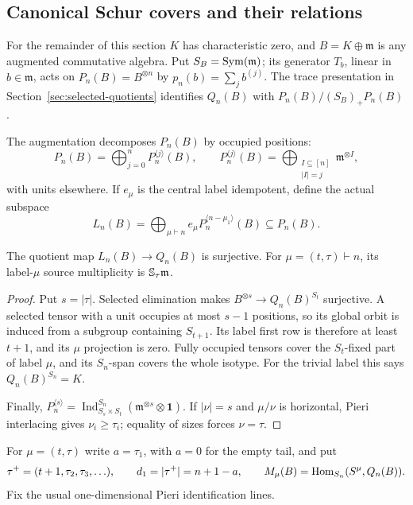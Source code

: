 \subsection{Canonical Schur covers and their relations}
\label{sec:schur-presentation}

For the remainder of this section $K$ has characteristic zero, and
$B=K\oplus\mathfrak m$ is any augmented commutative algebra. Put
$S_B=\operatorname{Sym}(\mathfrak m)$; its generator $T_b$, linear in $b\in\mathfrak m$,
acts on $P_n(B)=B^{\otimes n}$ by $p_n(b)=\sum_jb^{(j)}$.
The trace presentation in Section~\ref{sec:selected-quotients} identifies
$Q_n(B)$ with $P_n(B)/(S_B)_+P_n(B)$.

The augmentation decomposes $P_n(B)$ by occupied positions:
\[
 P_n(B)=\bigoplus_{j=0}^nP_n^{\langle j\rangle}(B),\qquad
 P_n^{\langle j\rangle}(B)=
       \bigoplus_{\substack{I\subseteq[n]\\|I|=j}}\mathfrak m^{\otimes I},
\]
with units elsewhere. If $e_\mu$ is the central label idempotent, define
the actual subspace
\[
 L_n(B)=\bigoplus_{\mu\vdash n}
          e_\mu P_n^{\langle n-\mu_1\rangle}(B)\subseteq P_n(B).
\]

\begin{lemma}
\label{lem:minimum-occupancy-cover}
The quotient map $L_n(B)\to Q_n(B)$ is surjective. For
$\mu=(t,\tau)\vdash n$, its label-$\mu$ source multiplicity is
$\mathbb S_\tau\mathfrak m$.
\end{lemma}
\begin{proof}
Put $s=|\tau|$. Selected elimination makes
$B^{\otimes s}\to Q_n(B)^{S_t}$ surjective. A selected tensor with
a unit occupies at most $s-1$ positions, so its global orbit is induced
from a subgroup containing $S_{t+1}$. Its label first row is therefore
at least $t+1$, and its $\mu$ projection is zero. Fully occupied
tensors cover the $S_t$-fixed part of label $\mu$, and its $S_n$-span
covers the whole isotype. For the trivial label this says
$Q_n(B)^{S_n}=K$.

Finally,
$P_n^{\langle s\rangle}=\operatorname{Ind}_{S_s\times S_t}^{S_n}
(\mathfrak m^{\otimes s}\otimes\mathbf1)$.
If $|\nu|=s$ and $\mu/\nu$ is horizontal, Pieri interlacing gives
$\nu_i\ge\tau_i$; equality of sizes forces $\nu=\tau$.
\end{proof}

For $\mu=(t,\tau)$ write $a=\tau_1$, with $a=0$ for the empty tail,
and put
\[
 \tau^+=(t+1,\tau_2,\tau_3,\ldots),\qquad
 d_1=|\tau^+|=n+1-a,
 \qquad M_\mu(B)=\operatorname{Hom}_{S_n}(S^\mu,Q_n(B)).
\]
Fix the usual one-dimensional Pieri identification lines.

